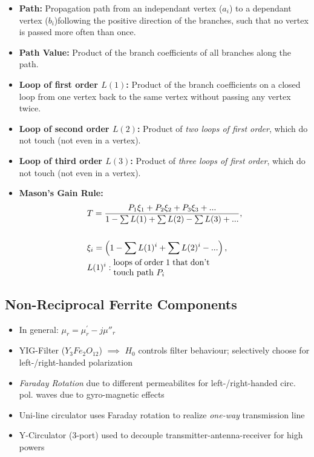 \begin{itemize}
\begin{itemize}
            \item \textbf{Path:} Propagation path from an independant vertex ($a_i$) to a dependant vertex ($b_i$)following the positive direction of the branches, such that no vertex is passed more often than once.
            \item \textbf{Path Value:} Product of the branch coefficients of all branches along the path.
            \item \textbf{Loop of first order $L(1)$:} Product of the branch coefficients on a closed loop from one vertex back to the same vertex without passing any vertex twice.
            \item \textbf{Loop of second order $L(2)$:} Product of \textit{two loops of first order}, which do not touch (not even in a vertex).
            \item \textbf{Loop of third order $L(3)$:} Product of \textit{three loops of first order}, which do not touch (not even in a vertex).
            \item \textbf{Mason's Gain Rule:}
                \begin{align*}
                    &T = \dfrac{P_1 \xi_1 + P_2\xi_2 + P_3\xi_3 +...}{1 - \sum L(1) + \sum L(2) - \sum L(3) + ...},\\\\
                    &\xi_i = \left(1 - \sum L(1)^i + \sum L(2)^i - ...\right),\\
                    &L(1)^i:\parbox{4cm}{loops of order 1 that don't touch path $P_i$}
                \end{align*}
        \end{itemize}
\end{itemize}

\subsection{Non-Reciprocal Ferrite  Components}
\begin{itemize}
    \itemsep0pt
    \item In general: \(\mu_r = \mu_r^\prime - j\mu''_r\)
    \item YIG-Filter ($Y_3 Fe_2 O_{12}$) $\implies$ $H_0$ controls filter behaviour; selectively choose for left-/right-handed polarization
    \item \textit{Faraday Rotation} due to different permeabilites for left-/right-handed circ. pol. waves due to gyro-magnetic effects
    \item Uni-line circulator uses Faraday rotation to realize \textit{one-way} transmission line
    \item Y-Circulator (3-port) used to decouple transmitter-antenna-receiver for high powers
\end{itemize}
